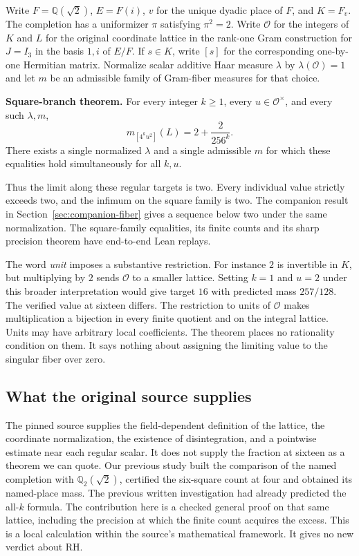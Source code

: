 \documentclass[12pt,letterpaper]{article}
\newcommand{\ruleline}{\par\vspace{1pt}{\color{accent}\rule{\linewidth}{.35pt}}\par}
\begin{document}
Write $F=\mathbb Q(\sqrt2)$, $E=F(i)$, $v$ for the unique dyadic place of $F$, and $K=F_v$. The completion has a uniformizer $\pi$ satisfying $\pi^2=2$. Write $\mathcal O$ for the integers of $K$ and $L$ for the original coordinate lattice in the rank-one Gram construction for $J=I_3$ in the basis $1,i$ of $E/F$. If $s\in K$, write $[s]$ for the corresponding one-by-one Hermitian matrix. Normalize scalar additive Haar measure $\lambda$ by $\lambda(\mathcal O)=1$ and let $m$ be an admissible family of Gram-fiber measures for that choice.

\begin{center}\begin{minipage}{.93\linewidth}\ruleline
\textbf{Square-branch theorem.} For every integer $k\geq1$, every $u\in\mathcal O^\times$, and every such $\lambda,m$,
\[
       m_{[4^k u^2]}(L)=2+\frac{2}{256^k}.
\]
There exists a single normalized $\lambda$ and a single admissible $m$ for which these equalities hold simultaneously for all $k,u$.
\ruleline\end{minipage}\end{center}
Thus the limit along these regular targets is two. Every individual value strictly exceeds two, and the infimum on the square family is two. The companion result in Section~\ref{sec:companion-fiber} gives a sequence below two under the same normalization. The square-family equalities, its finite counts and its sharp precision theorem have end-to-end Lean replays.

The word \emph{unit} imposes a substantive restriction. For instance $2$ is invertible in $K$, but multiplying by $2$ sends $\mathcal O$ to a smaller lattice. Setting $k=1$ and $u=2$ under this broader interpretation would give target $16$ with predicted mass $257/128$. The verified value at sixteen differs. The restriction to units of $\mathcal O$ makes multiplication a bijection in every finite quotient and on the integral lattice. Units may have arbitrary local coefficients. The theorem places no rationality condition on them. It says nothing about assigning the limiting value to the singular fiber over zero.

\subsection{What the original source supplies}
The pinned source supplies the field-dependent definition of the lattice, the coordinate normalization, the existence of disintegration, and a pointwise estimate near each regular scalar. It does not supply the fraction at sixteen as a theorem we can quote. Our previous study built the comparison of the named completion with $\mathbb Q_2(\sqrt2)$, certified the six-square count at four and obtained its named-place mass. The previous written investigation had already predicted the all-$k$ formula. The contribution here is a checked general proof on that same lattice, including the precision at which the finite count acquires the excess. This is a local calculation within the source's mathematical framework. It gives no new verdict about RH.
\end{document}
